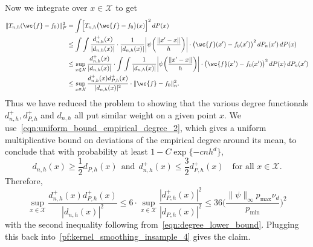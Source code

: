 \documentclass[aos]{imsart}
\theoremstyle{plain}
\theoremstyle{definition}
\theoremstyle{remark}
\newcommand{\mc}[1]{\mathcal{#1}}
\newcommand{\1}{\mathbf{1}}
\begin{document}
Now we integrate over $x \in \mc{X}$ to get 
\begin{align}
\|T_{n,h}(\wc{f} - f_0)\|_P^2 & = \int \Bigl[T_{n,h}\bigl(\wc{f} - f_0\bigr)(x)\Bigr]^2 \,dP(x) \nonumber \\
& \leq \int \int \frac{d_{n,h}^{+}(x)}{|d_{n,h}(x)|} \cdot \frac{1}{|d_{n,h}(x)|} \biggl|\psi\biggl(\frac{\|x' - x\|}{h}\biggr)\biggr| \cdot \bigl(\wc{f}(x') - f_0(x')\bigr)^2 \,dP_n(x') \,dP(x) \nonumber \\
& \leq \sup_{x \in \mc{X}} \frac{d_{n,h}^{+}(x)}{|d_{n,h}(x)|} \cdot \int \int  \frac{1}{|d_{n,h}(x)|} \biggl|\psi\biggl(\frac{\|x' - x\|}{h}\biggr)\biggr| \cdot \bigl(\wc{f}(x') - f_0(x')\bigr)^2 \,dP(x) \,dP_n(x') \nonumber \\
& \leq \sup_{x \in \mc{X}} \frac{d_{n,h}^{+}(x) d_{P,h}^+(x)}{|d_{n,h}(x)|^2} \cdot \|\wc{f} - f_0\|_n^2. \label{pf:kernel_smoothing_insample_4}
\end{align}
Thus we have reduced the problem to showing that the various degree functionals $d_{n,h}^{+}, d_{P,h}^{+}$ and $d_{n,h}$ all put similar weight on a given point $x$. We use~\eqref{eqn:uniform_bound_empirical_degree_2}, which gives a uniform multiplicative bound on deviations of the empirical degree around its mean, to conclude that with probability at least $1 - C\exp\{-cnh^d\}$,
\begin{equation*}
d_{n,h}(x) \geq \frac{1}{2}d_{P,h}(x)~~ \textrm{and} ~~ d_{n,h}^{+}(x) \leq \frac{3}{2} d_{P,h}^{+}(x) \quad\textrm{for all $x \in \mc{X}$.}
\end{equation*}
Therefore,
\begin{equation*}
\sup_{x \in \mc{X}} \frac{d_{n,h}^{+}(x) d_{P,h}^+(x)}{|d_{n,h}(x)|^2} \leq 6 \cdot \sup_{x \in \mc{X}} \frac{|d_{P,h}^{+}(x)|^2}{|d_{P,h}(x)|^2} \leq 36 \biggl(\frac{\|\psi\|_{\infty} p_{\max} \nu_d}{p_{\min}}\biggr)^2
\end{equation*}
with the second inequality following from~\eqref{eqn:degree_lower_bound}. Plugging this back into~\eqref{pf:kernel_smoothing_insample_4} gives the claim.
\end{document}
